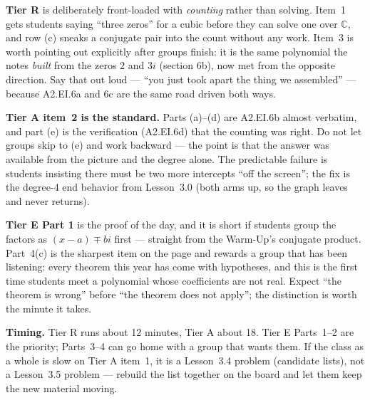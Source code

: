 \documentclass[10pt]{article}
\begin{document}
\begin{teachernote}
\textbf{Tier R} is deliberately front-loaded with \emph{counting} rather than solving. Item~1 gets
students saying ``three zeros'' for a cubic before they can solve one over $\mathbb{C}$, and row (c)
sneaks a conjugate pair into the count without any work. Item~3 is worth pointing out explicitly
after groups finish: it is the same polynomial the notes \emph{built} from the zeros $2$ and $3i$
(section 6b), now met from the opposite direction. Say that out loud --- ``you just took apart the
thing we assembled'' --- because A2.EI.6a and 6c are the same road driven both ways.

\vspace{3pt}
\textbf{Tier A item~2 is the standard.} Parts (a)--(d) are A2.EI.6b almost verbatim, and part (e) is
the verification (A2.EI.6d) that the counting was right. Do not let groups skip to (e) and work
backward --- the point is that the answer was available from the picture and the degree alone. The
predictable failure is students insisting there must be two more intercepts ``off the screen''; the
fix is the degree-4 end behavior from Lesson~3.0 (both arms up, so the graph leaves and never
returns).

\vspace{3pt}
\textbf{Tier E Part 1} is the proof of the day, and it is short if students group the factors as
$(x-a)\mp bi$ first --- straight from the Warm-Up's conjugate product. Part~4(c) is the sharpest item
on the page and rewards a group that has been listening: every theorem this year has come with
hypotheses, and this is the first time students meet a polynomial whose coefficients are not real.
Expect ``the theorem is wrong'' before ``the theorem does not apply''; the distinction is worth the
minute it takes.

\vspace{3pt}
\textbf{Timing.} Tier R runs about 12 minutes, Tier A about 18. Tier E Parts~1--2 are the priority;
Parts~3--4 can go home with a group that wants them. If the class as a whole is slow on Tier A
item~1, it is a Lesson~3.4 problem (candidate lists), not a Lesson~3.5 problem --- rebuild the list
together on the board and let them keep the new material moving.
\end{teachernote}
\end{document}
